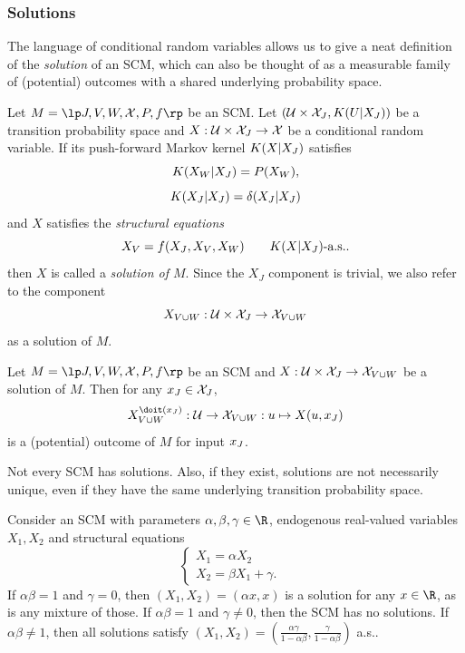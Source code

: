\subsubsection{Solutions}

The language of conditional random variables allows us to give a neat definition of the \emph{solution} of an SCM, which can also be thought of as a measurable family of (potential) outcomes with a shared underlying probability space.

\begin{Def}\label{def:scm_solutions}
  Let $M = \lt \Sin, \Send, \Srnd, \CX, P, f \rt$ be an SCM.
  Let $(\mathcal{U} \times \mathcal{X}_{J}, K(U|X_J))$ be a transition probability space and $X : \mathcal{U} \times \mathcal{X}_{J} \to \mathcal{X}$ be a conditional random variable.
  If its push-forward Markov kernel $K(X | X_{J})$ satisfies
  $$K(X_W | X_{J}) = P(X_W),$$
  $$K(X_J | X_{J}) = \delta(X_{J}|X_{J})$$
  and $X$ satisfies the \emph{structural equations}
    \begin{equation}\label{eq:scm_structural_equations}
      X_{V} = f(X_{J}, X_{V}, X_{W}) \qquad \text{$K(X|X_J)$-a.s.}.
    \end{equation}
  then $X$ is called a \emph{solution of $M$}.
  Since the $X_J$ component is trivial, we also refer to the component 
  $$X_{V\cup W} : \mathcal{U} \times \mathcal{X}_{J} \to \mathcal{X}_{V\cup W}$$
  as a solution of $M$.
\end{Def}
\begin{Rem}\label{def:scm_potential_outcome}
  Let $M = \lt \Sin, \Send, \Srnd, \CX, P, f \rt$ be an SCM and $X : \mathcal{U} \times \mathcal{X}_{J} \to \mathcal{X}_{V\cup W}$ be a solution of $M$. 
  Then for any $x_{J} \in \mathcal{X}_{J}$, 
  $$X^{\doit(\xJ)}_{V\cup W} : \C{U} \to \CX_{V\cup W} : u \mapsto X(u,\xJ)$$ 
  is a (potential) outcome of $M$ for input $x_{J}$.
\end{Rem}
Not every SCM has solutions. Also, if they exist,
solutions  are not necessarily unique, even if they have the same underlying transition probability space.
\begin{Eg}\label{eg:not_every_scm_has_solutions}
Consider an SCM with parameters $\alpha,\beta,\gamma \in \RN$, endogenous real-valued variables $X_1,X_2$ and structural equations
$$\begin{cases}
  X_1 = \alpha X_2 & \\
  X_2 = \beta X_1 + \gamma. &
\end{cases}$$
If $\alpha \beta = 1$ and $\gamma = 0$, then $(X_1,X_2) = (\alpha x,x)$ is a solution for any $x\in\RN$, as is any mixture of those. 
If $\alpha \beta = 1$ and $\gamma \ne 0$, then the SCM has no solutions. 
If $\alpha \beta \ne 1$, then all solutions satisfy $(X_1,X_2) = (\frac{\alpha \gamma}{1 - \alpha\beta},\frac{\gamma}{1 - \alpha\beta})$ a.s..
\end{Eg}

